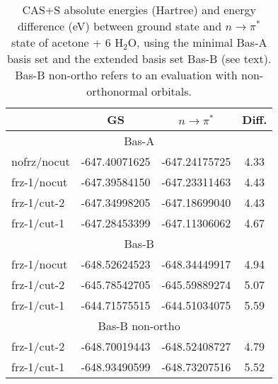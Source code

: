\begin{center}
\begin{table}[ht]
\begin{center}
\footnotesize
\begin{tabular*}{0.80\textwidth}{l@{\hspace*{10mm}}ccc}
\hline                                                      
        &    GS       &  $n \rightarrow \pi^{*}$     &   Diff.     \\
\hline                                                      
       \multicolumn{4}{c}{Bas-A} \\
nofrz/nocut	&  -647.40071625 & -647.24175725 & 4.33 \\
frz-1/nocut &  -647.39584150 & -647.23311463 & 4.43 \\
frz-1/cut-2 &  -647.34998205 & -647.18699040 & 4.43 \\
frz-1/cut-1 &  -647.28453399 & -647.11306062 & 4.67 \\
        \multicolumn{4}{c}{Bas-B} \\
frz-1/nocut &  -648.52624523 & -648.34449917 & 4.94 \\
frz-1/cut-2 &  -645.78542705 & -645.59889274 & 5.07 \\
frz-1/cut-1 &  -644.71575515 & -644.51034075 & 5.59 \\
       \multicolumn{4}{c}{Bas-B non-ortho}  \\
frz-1/cut-2 &  -648.70019443 & -648.52408727 & 4.79 \\
frz-1/cut-1 &  -648.93490599 & -648.73207516 & 5.52 \\
\hline
\end{tabular*}
\end{center}
\caption{\footnotesize CAS+S absolute energies (Hartree) and energy
difference (eV) between ground state and $n \rightarrow \pi^{*}$ state of
acetone + 6 H$_2$O, using the minimal Bas-A basis set and the extended basis
set Bas-B (see text). Bas-B non-ortho refers to an evaluation with 
non-orthonormal orbitals.}
\label{tbl:acetone_basis}
\end{table}
\end{center}

